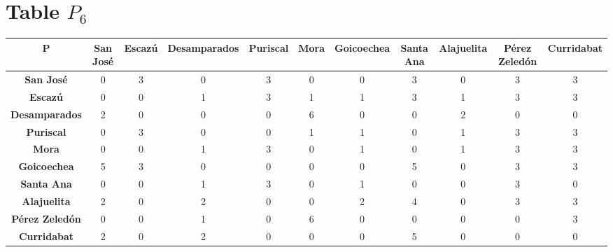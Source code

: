 \documentclass{article}
\begin{document}
\section{Table $P_{6}$}
\begin{center}
    \begin{tabular}{|c||c|c|c|c|c|c|c|c|c|c|}
        \hline
        \textbf{P} & \textbf{San José} & \textbf{Escazú} & \textbf{Desamparados} & \textbf{Puriscal} & \textbf{Mora} & \textbf{Goicoechea} & \textbf{Santa Ana} & \textbf{Alajuelita} & \textbf{Pérez Zeledón} & \textbf{Curridabat} \\
        \hline
        \hline
        \textbf{San José}& 0 & 3 & 0 & 3 & 0 & 0 & 3 & 0 & 3 & 3 \\
        \hline
        \textbf{Escazú}& 0 & 0 & 1 & 3 & 1 & 1 & 3 & 1 & 3 & 3 \\
        \hline
        \textbf{Desamparados}& 2 & 0 & 0 & 0 & \cellcolor[HTML]{D74894}$6$ & 0 & 0 & 2 & 0 & 0 \\
        \hline
        \textbf{Puriscal}& 0 & 3 & 0 & 0 & 1 & 1 & 0 & 1 & 3 & 3 \\
        \hline
        \textbf{Mora}& 0 & 0 & 1 & 3 & 0 & 1 & 0 & 1 & 3 & 3 \\
        \hline
        \textbf{Goicoechea}& 5 & 3 & 0 & 0 & 0 & 0 & 5 & 0 & 3 & 3 \\
        \hline
        \textbf{Santa Ana}& 0 & 0 & 1 & 3 & 0 & 1 & 0 & 0 & 3 & 0 \\
        \hline
        \textbf{Alajuelita}& 2 & 0 & 2 & 0 & 0 & 2 & 4 & 0 & 3 & 3 \\
        \hline
        \textbf{Pérez Zeledón}& 0 & 0 & 1 & 0 & \cellcolor[HTML]{D74894}$6$ & 0 & 0 & 0 & 0 & 3 \\
        \hline
        \textbf{Curridabat}& 2 & 0 & 2 & 0 & 0 & 0 & 5 & 0 & 0 & 0 \\
        \hline
    \end{tabular}
\end{center}
\end{document}

